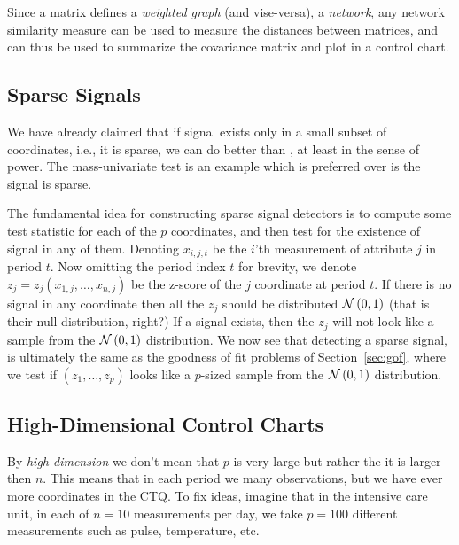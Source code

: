 \begin{extra}
Since a matrix defines a \emph{weighted graph} (and vise-versa), \aka a \emph{network}, any network similarity measure can be used to measure the distances between matrices, and can thus be used to summarize the covariance matrix and plot in a control chart.
\end{extra}





\subsection{Sparse Signals}

We have already claimed that if signal exists only in a small subset of coordinates, i.e., it is sparse, we can do better than \tsq, at least in the sense of power.
The mass-univariate test is an example which is preferred over \tsq is the signal is sparse.



\begin{extra}

The fundamental idea for constructing sparse signal detectors is to compute some test statistic for each of the $p$ coordinates, and then test for the existence of signal in any of them. 
Denoting $x_{i,j,t}$ be the $i$'th measurement of attribute $j$ in period $t$.
Now omitting the period index $t$ for brevity, we denote $z_j=z_j(x_{1,j},\dots,x_{n,j})$ be the z-score of the $j$ coordinate at period $t$. 
If there is no signal in any coordinate then all the $z_j$ should be distributed $\mathcal{N}\left(0,1\right)$ (that is their null distribution, right?)
If a signal exists, then the $z_j$ will not look like a sample from the $\mathcal{N}\left(0,1\right)$ distribution. 
We now see that detecting a sparse signal, is ultimately the same as the goodness of fit problems of Section~\ref{sec:gof}, where we test if $(z_1,\dots,z_p)$ looks like a $p$-sized sample from the $\mathcal{N}\left(0,1\right)$ distribution.

\end{extra}





\subsection{High-Dimensional Control Charts}

By \emph{high dimension} we don't mean that $p$ is very large but rather the it is larger then $n$.
This means that in each period we many observations, but we have ever more coordinates in the CTQ.
To fix ideas, imagine that in the intensive care unit, in each of $n=10$ measurements per day, we take $p=100$ different measurements such as pulse, temperature, etc.


